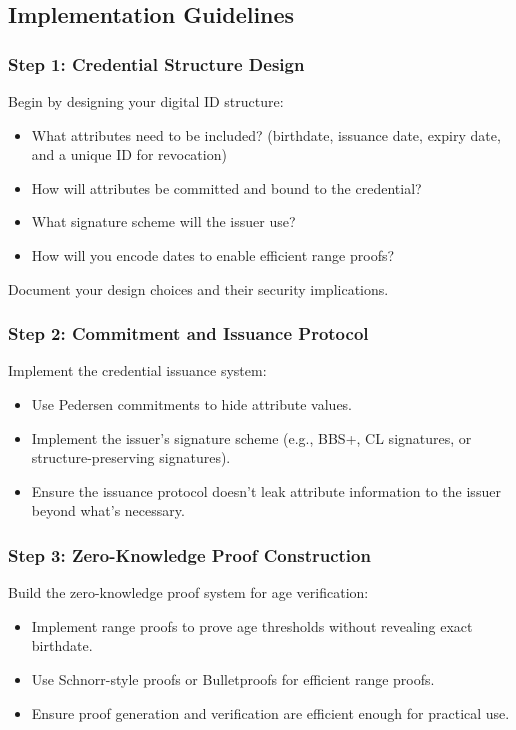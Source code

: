 \documentclass[10pt,a4paper,american]{exam}
\begin{document}
\subsection*{Implementation Guidelines}

\subsubsection*{Step 1: Credential Structure Design}
Begin by designing your digital ID structure:
\begin{itemize}
	\item What attributes need to be included? (birthdate, issuance date, expiry date, and a unique ID for revocation)
	\item How will attributes be committed and bound to the credential?
	\item What signature scheme will the issuer use?
	\item How will you encode dates to enable efficient range proofs?
\end{itemize}

Document your design choices and their security implications.

\subsubsection*{Step 2: Commitment and Issuance Protocol}
Implement the credential issuance system:
\begin{itemize}
	\item Use Pedersen commitments to hide attribute values.
	\item Implement the issuer's signature scheme (e.g., BBS+, CL signatures, or structure-preserving signatures).
	\item Ensure the issuance protocol doesn't leak attribute information to the issuer beyond what's necessary.
\end{itemize}

\subsubsection*{Step 3: Zero-Knowledge Proof Construction}
Build the zero-knowledge proof system for age verification:
\begin{itemize}
	\item Implement range proofs to prove age thresholds without revealing exact birthdate.
	\item Use Schnorr-style proofs or Bulletproofs for efficient range proofs.
	\item Ensure proof generation and verification are efficient enough for practical use.
\end{itemize}
\end{document}
